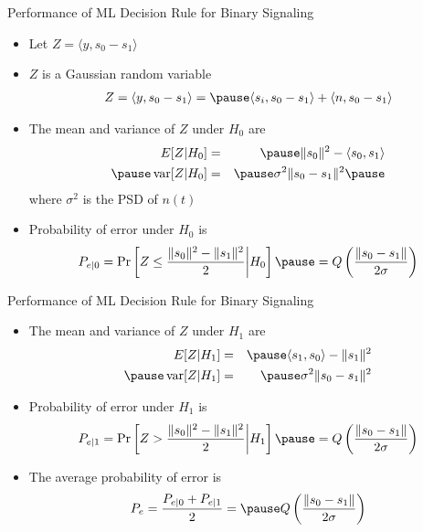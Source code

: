\documentclass[t]{beamer}
\newcommand{\var}{\operatornamewithlimits{var}}
\begin{document}
\begin{frame}{Performance of ML Decision Rule for Binary Signaling}
  \footnotesize
  \begin{itemize}
    \item \pause Let $Z = \langle y, s_0 - s_1 \rangle$
    \item \pause $Z$ is a Gaussian random variable \pause
      \begin{eqnarray*}
        Z = \langle y, s_0 - s_1 \rangle = \pause \langle s_i, s_0 - s_1 \rangle + \langle n, s_0 - s_1 \rangle
      \end{eqnarray*}
    \item \pause The mean and variance of $Z$ under $H_0$ are
      \begin{eqnarray*}
        E[Z|H_0] & = & \pause \lVert s_0 \rVert^2 - \langle s_0,s_1 \rangle \\ \pause
        \var[Z|H_0] & = & \pause \sigma^2\lVert s_0 - s_1\rVert^2 \pause
      \end{eqnarray*}
      where $\sigma^2$ is the PSD of $n(t)$
    \item \pause Probability of error under $H_0$ is
      \begin{eqnarray*}
        P_{e|0} = \Pr\left[ Z \leq  \frac{\lVert s_0 \rVert^2 -\lVert s_1 \rVert^2}{2} \bigg| H_0\right] \pause = Q\left(\frac{\lVert s_0 - s_1 \rVert}{2\sigma} \right) 
      \end{eqnarray*}
  \end{itemize}
  \normalsize
\end{frame}

\begin{frame}{Performance of ML Decision Rule for Binary Signaling}
  \footnotesize
  \begin{itemize}
    \item The mean and variance of $Z$ under $H_1$ are
      \begin{eqnarray*}
        E[Z|H_1] & = & \pause \langle s_1,s_0 \rangle - \lVert s_1 \rVert^2  \\ \pause
        \var[Z|H_1] & = & \pause \sigma^2\lVert s_0 - s_1\rVert^2
      \end{eqnarray*}
    \item \pause Probability of error under $H_1$ is
      \begin{eqnarray*}
        P_{e|1} = \Pr\left[ Z >  \frac{\lVert s_0 \rVert^2 -\lVert s_1 \rVert^2}{2} \bigg| H_1\right] \pause = Q\left(\frac{\lVert s_0 - s_1 \rVert}{2\sigma} \right)
      \end{eqnarray*}
    \item \pause The average probability of error is
      \begin{eqnarray*}
        P_e = \frac{P_{e|0}+P_{e|1}}{2} = \pause Q\left(\frac{\lVert s_0 - s_1 \rVert}{2\sigma} \right)
      \end{eqnarray*}
  \end{itemize}
  \normalsize
\end{frame}
\end{document}
